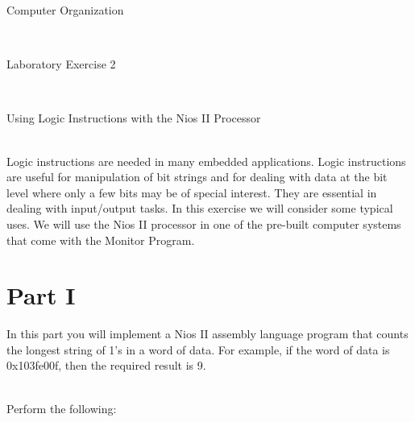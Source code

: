 \documentclass[epsfig,10pt,fullpage]{article}
\newcommand{\LabNum}{2}
\begin{document}
\centerline{\huge Computer Organization}
~\\
\centerline{\huge Laboratory Exercise \LabNum}
~\\
\centerline{\large Using Logic Instructions with the Nios\textsuperscript{\textregistered} II Processor}
~\\


Logic instructions are needed in many embedded applications.  Logic instructions are useful 
for manipulation of bit strings and for dealing with data at the bit level where only a 
few bits may be of special interest.  They are essential in dealing with input/output tasks.
In this exercise we will consider some typical uses.
We will use the Nios\textsuperscript{\textregistered} II processor in one of the pre-built computer systems that come with the Monitor Program.

\section*{Part I}
In this part you will implement a Nios II assembly language program that counts the longest 
string of 1's in a word of data. For example, if the word of data is {\sf 0x103fe00f}, then 
the required result is 9.

~\\
Perform the following:
\end{document}
